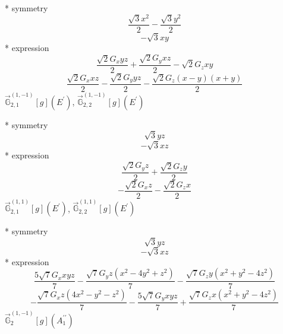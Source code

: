 \documentclass[fleqn,8pt]{jsarticle}
\begin{document}
\noindent\quad ** symmetry
\begin{dmath*}
\frac{\sqrt{3} x^{2}}{2} - \frac{\sqrt{3} y^{2}}{2}
\end{dmath*}
\begin{dmath*}
- \sqrt{3} x y
\end{dmath*}
\noindent\quad ** expression
\begin{dmath*}
\frac{\sqrt{2} G_{x} y z}{2} + \frac{\sqrt{2} G_{y} x z}{2} - \sqrt{2} G_{z} x y
\end{dmath*}
\begin{dmath*}
\frac{\sqrt{2} G_{x} x z}{2} - \frac{\sqrt{2} G_{y} y z}{2} - \frac{\sqrt{2} G_{z} \left(x - y\right) \left(x + y\right)}{2}
\end{dmath*}
\noindent\quad $\vec{\mathbb{G}}_{2,1}^{(1,-1)}[g](E^{\prime})$, $\vec{\mathbb{G}}_{2,2}^{(1,-1)}[g](E^{\prime})$

\noindent\quad ** symmetry
\begin{dmath*}
\sqrt{3} y z
\end{dmath*}
\begin{dmath*}
- \sqrt{3} x z
\end{dmath*}
\noindent\quad ** expression
\begin{dmath*}
\frac{\sqrt{2} G_{y} z}{2} + \frac{\sqrt{2} G_{z} y}{2}
\end{dmath*}
\begin{dmath*}
- \frac{\sqrt{2} G_{x} z}{2} - \frac{\sqrt{2} G_{z} x}{2}
\end{dmath*}
\noindent\quad $\vec{\mathbb{G}}_{2,1}^{(1,1)}[g](E^{\prime})$, $\vec{\mathbb{G}}_{2,2}^{(1,1)}[g](E^{\prime})$

\noindent\quad ** symmetry
\begin{dmath*}
\sqrt{3} y z
\end{dmath*}
\begin{dmath*}
- \sqrt{3} x z
\end{dmath*}
\noindent\quad ** expression
\begin{dmath*}
\frac{5 \sqrt{7} G_{x} x y z}{7} - \frac{\sqrt{7} G_{y} z \left(x^{2} - 4 y^{2} + z^{2}\right)}{7} - \frac{\sqrt{7} G_{z} y \left(x^{2} + y^{2} - 4 z^{2}\right)}{7}
\end{dmath*}
\begin{dmath*}
- \frac{\sqrt{7} G_{x} z \left(4 x^{2} - y^{2} - z^{2}\right)}{7} - \frac{5 \sqrt{7} G_{y} x y z}{7} + \frac{\sqrt{7} G_{z} x \left(x^{2} + y^{2} - 4 z^{2}\right)}{7}
\end{dmath*}
\noindent\quad $\vec{\mathbb{G}}_{2}^{(1,-1)}[g](A_{1}^{\prime\prime})$
\end{document}
